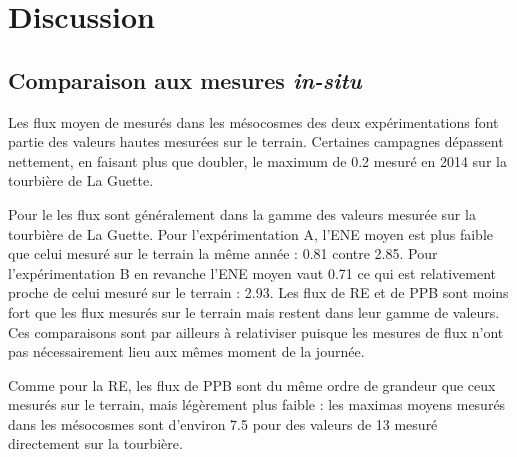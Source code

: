 \section{Discussion}

\subsection{Comparaison aux mesures \textit{in-situ}}

Les flux moyen de \chh mesurés dans les mésocosmes des deux expérimentations font partie des valeurs hautes mesurées sur le terrain.
Certaines campagnes dépassent nettement, en faisant plus que doubler, le maximum de \SI{0.2}{\uml} mesuré en 2014 sur la tourbière de La Guette.

Pour le \coo les flux sont généralement dans la gamme des valeurs mesurée sur la tourbière de La Guette.
Pour l'expérimentation A, l'ENE moyen est plus faible que celui mesuré sur le terrain la même année : \num{0.81} contre \SI{2.85}{\uml}.
Pour l'expérimentation B en revanche l'ENE moyen vaut \SI{0.71}{\uml} ce qui est relativement proche de celui mesuré sur le terrain : \SI{2.93}{\uml}.
Les flux de RE et de PPB sont moins fort que les flux mesurés sur le terrain mais restent dans leur gamme de valeurs.
Ces comparaisons sont par ailleurs à relativiser puisque les mesures de flux n'ont pas nécessairement lieu aux mêmes moment de la journée.


%
%
%


Comme pour la RE, les flux de PPB sont du même ordre de grandeur que ceux mesurés sur le terrain, mais légèrement plus faible : les maximas moyens mesurés dans les mésocosmes sont d'environ \num{7.5} pour des valeurs de \SI{13}{\uml} mesuré directement sur la tourbière.

